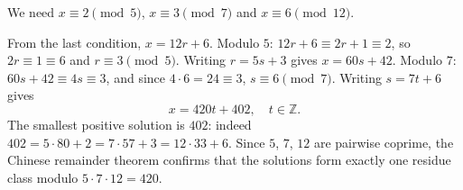 We need $x\equiv2\pmod5$, $x\equiv3\pmod7$ and $x\equiv6\pmod{12}$.

From the last condition, $x=12r+6$. Modulo $5$: $12r+6\equiv2r+1\equiv2$, so $2r\equiv1\equiv6$ and $r\equiv3\pmod5$. Writing $r=5s+3$ gives $x=60s+42$. Modulo $7$: $60s+42\equiv4s\equiv3$, and since $4\cdot6=24\equiv3$, $s\equiv6\pmod7$. Writing $s=7t+6$ gives
\[
\boxed{x=420t+402,\quad t\in\mathbb{Z}} .
\]
The smallest positive solution is $402$: indeed $402=5\cdot80+2=7\cdot57+3=12\cdot33+6$. Since $5$, $7$, $12$ are pairwise coprime, the Chinese remainder theorem confirms that the solutions form exactly one residue class modulo $5\cdot7\cdot12=420$.
